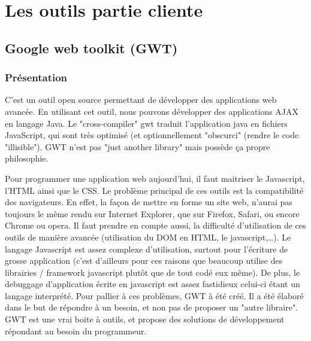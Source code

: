 \section{Les outils partie cliente}
\subsection{Google web toolkit (GWT)}

\subsubsection{Présentation}
C'est un outil open source permettant de développer des applications web avancée. En utilisant cet outil, nous pouvons développer des applications AJAX en langage Java. 
Le "cross-compiler" gwt traduit l'application java en fichiers JavaScript, qui sont très optimisé (et optionnellement "obscurci" (rendre le code "illisible").
GWT n'est pas "just another library" mais possède ça propre philosophie.

Pour programmer une application web aujourd'hui, il faut maitriser le Javascript, l'HTML ainsi que le CSS. Le problème principal de ces outils est la compatibilité des navigateurs. En effet, la façon de mettre en forme un site web, n'aurai pas toujours le même rendu sur Internet Explorer, que sur Firefox, Safari, ou encore Chrome ou opera. Il faut prendre en compte aussi, la difficulté d'utilisation de ces outils de manière avancée (utilisation du DOM en HTML, le javascript,…). Le langage Javascript est assez complexe d'utilisation, surtout pour l'écriture de grosse application (c'est d'ailleurs pour ces raisons que beaucoup utilise des librairies / framework javascript plutôt que de tout codé eux même). De plus, le debuggage d'application écrite en javascript est assez fastidieux celui-ci étant un langage interprété. Pour pallier à ces problèmes, GWT à été créé. Il a été élaboré dans le but de répondre à un besoin, et non pas de proposer un "autre libraire". GWT est une vrai boite à outils, et propose des solutions de développement répondant au besoin du programmeur.

